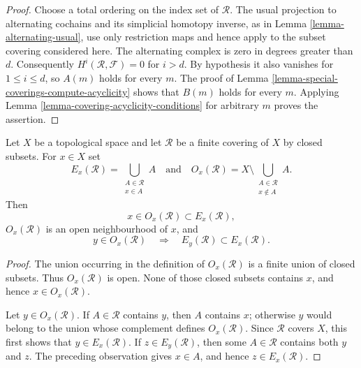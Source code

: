 \begin{proof}
Choose a total ordering on the index set of $\mathcal R$. The usual
projection to alternating cochains and its simplicial homotopy inverse, as
in Lemma \ref{lemma-alternating-usual}, use only restriction maps and hence
apply to the subset covering considered here. The alternating complex is
zero in degrees greater than $d$. Consequently
$H^i(\mathcal R,\mathcal F)=0$ for $i>d$. By hypothesis it also vanishes
for $1\leq i\leq d$, so $A(m)$ holds for every $m$. The proof of Lemma
\ref{lemma-special-coverings-compute-acyclicity} shows that $B(m)$ holds for
every $m$. Applying Lemma \ref{lemma-covering-acyclicity-conditions} for
arbitrary $m$ proves the assertion.
\end{proof}


\begin{lemma}
\label{lemma-finite-closed-covering-star-neighbourhood}
\begin{reference}
\cite[Chapter III, \S 3.9, p. 180]{Tohoku}
\end{reference}
Let $X$ be a topological space and let $\mathcal{R}$ be a finite covering
of $X$ by closed subsets. For $x \in X$ set
$$
E_x(\mathcal{R}) =
\bigcup_{\substack{A \in \mathcal{R} \\ x \in A}} A
\quad\text{and}\quad
O_x(\mathcal{R}) =
X \setminus
\bigcup_{\substack{A \in \mathcal{R} \\ x \notin A}} A.
$$
Then
$$
x \in O_x(\mathcal{R}) \subset E_x(\mathcal{R}),
$$
$O_x(\mathcal{R})$ is an open neighbourhood of $x$, and
$$
y \in O_x(\mathcal{R})
\quad\Longrightarrow\quad
E_y(\mathcal{R}) \subset E_x(\mathcal{R}).
$$
\end{lemma}

\begin{proof}
The union occurring in the definition of $O_x(\mathcal{R})$ is a finite
union of closed subsets. Thus $O_x(\mathcal{R})$ is open. None of those
closed subsets contains $x$, and hence $x \in O_x(\mathcal{R})$.

Let $y \in O_x(\mathcal{R})$. If $A \in \mathcal{R}$ contains $y$, then
$A$ contains $x$; otherwise $y$ would belong to the union whose complement
defines $O_x(\mathcal{R})$. Since $\mathcal{R}$ covers $X$, this first shows
that $y \in E_x(\mathcal{R})$. If $z \in E_y(\mathcal{R})$, then some
$A \in \mathcal{R}$ contains both $y$ and $z$. The preceding observation
gives $x \in A$, and hence $z \in E_x(\mathcal{R})$.
\end{proof}

